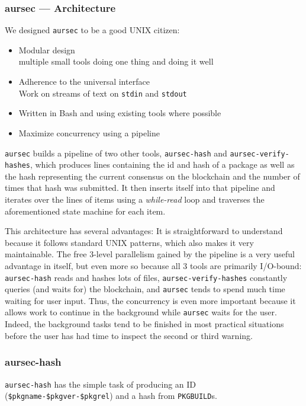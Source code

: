 \subsubsection{aursec --- Architecture}
We designed \texttt{aursec} to be a good UNIX citizen:

\begin{itemize}
\item Modular design \\ multiple small tools doing one thing and doing it well
\item Adherence to the universal interface \cite{Salus:1994} \\
  Work on streams of text on \texttt{stdin} and \texttt{stdout}
\item Written in Bash and using existing tools where possible
\item Maximize concurrency using a pipeline
\end{itemize}

\texttt{aursec} builds a pipeline of two other tools, \texttt{aursec-hash} and \texttt{aursec-verify-hashes}, which produces lines containing the id and hash of a package as well as the hash representing the current consensus on the blockchain and the number of times that hash was submitted.
It then inserts itself into that pipeline and iterates over the lines of items using a \emph{while-read} loop and traverses the aforementioned state machine for each item.

This architecture has several advantages: It is straightforward to understand because it follows standard UNIX patterns, which also makes it very maintainable.
The free 3-level parallelism gained by the pipeline is a very useful advantage in itself, but even more so because all 3 tools are primarily I/O-bound: \texttt{aursec-hash} reads and hashes lots of files, \texttt{aursec-verify-hashes} constantly queries (and waits for) the blockchain, and \texttt{aursec} tends to spend much time waiting for user input.
Thus, the concurrency is even more important because it allows work to continue in the background while \texttt{aursec} waits for the user. Indeed, the background tasks tend to be finished in most practical situations before the user has had time to inspect the second or third warning. %

\subsubsection{aursec-hash}
\texttt{aursec-hash} has the simple task of producing an ID (\texttt{\$pkgname-\$pkgver-\$pkgrel}) and a hash from \texttt{PKGBUILD}s.

